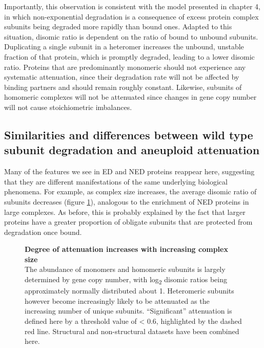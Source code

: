 \documentclass[a4paper,11pt,twoside,openright]{scrbook}
\begin{document}
Importantly, this observation is consistent with the model presented in chapter
4, in which non-exponential degradation is a consequence of excess protein
complex subunits being degraded more rapidly than bound ones. Adapted to this
situation, disomic ratio is dependent on the ratio of bound to unbound subunits.
Duplicating a single subunit in a heteromer increases the unbound, unstable
fraction of that protein, which is promptly degraded, leading to a lower disomic
ratio. Proteins that are predominantly monomeric should not experience any
systematic attenuation, since their degradation rate will not be affected by
binding partners and should remain roughly constant. Likewise, subunits of
homomeric complexes will not be attenuated since changes in gene copy number
will not cause stoichiometric imbalances.

\subsection{Similarities and differences between wild type subunit degradation
and aneuploid attenuation}
Many of the features we see in ED and NED proteins reappear here, suggesting
that they are different manifestations of the same underlying biological
phenomena. For example, as complex size increases, the average disomic ratio of
subunits decreases (figure \ref{figure:aneuploidusubs}), analogous to the
enrichment of NED proteins in large complexes. As before, this is probably
explained by the fact that larger proteins have a greater proportion of obligate
subunits that are protected from degradation once bound.

\begin{figure}[h]
    \caption[Degree of attenuation increases with increasing complex
    size]{\sffamily \textbf{Degree of attenuation increases with increasing
    complex size} \\ \small The abundance of monomers and homomeric subunits is
    largely determined by gene copy number, with log\textsubscript{2} disomic
    ratios being approximately normally distributed about 1. Heteromeric
    subunits however become increasingly likely to be attenuated as the
    increasing number of unique subunits. “Significant” attenuation is defined
    here by a threshold value of < 0.6, highlighted by the dashed red line.
    Structural and non-structural datasets have been combined here.}
    \label{figure:aneuploidusubs}
\end{figure}
\end{document}
